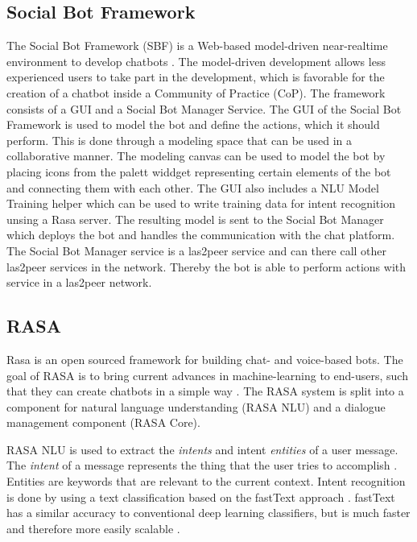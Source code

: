 \subsection{Social Bot Framework}
The Social Bot Framework (SBF) is a Web-based model-driven near-realtime environment to develop chatbots \cite{NLKl19}. 
The model-driven development allows less experienced users to take part in the development, which is favorable for the creation of a chatbot inside a Community of Practice (CoP). 
The framework consists of a GUI and a Social Bot Manager Service.
The GUI of the Social Bot Framework is used to model the bot and define the actions, which it should perform. 
This is done through a modeling space that can be used in a collaborative manner. The modeling canvas can be used to model the bot by placing icons from the palett widdget representing certain elements of the bot and connecting them with each other. 
The GUI also includes a NLU Model Training helper which can be used to write training data for intent recognition unsing a Rasa server.
The resulting model is sent to the Social Bot Manager which deploys the bot and handles the communication with the chat platform. 
The Social Bot Manager service is a las2peer service and can there call other las2peer services in the network. 
Thereby the bot is able to perform actions with service in a las2peer network.

\subsection{RASA}
Rasa is an open sourced framework for building chat- and voice-based bots. The goal of RASA is to bring current advances in machine-learning to end-users, such that they can create chatbots in a simple way \cite{BFPN17}. 
The RASA system is split into a component for natural language understanding (RASA NLU) and a dialogue management component (RASA Core).

RASA NLU is used to extract the \emph{intents} and intent \emph{entities} of a user message.
The \emph{intent} of a message represents the thing that the user tries to accomplish \footnotemark. 
Entities are keywords that are relevant to the current context.
Intent recognition is done by using a text classification based on the fastText approach \cite{BFPN17}. 
fastText has a similar accuracy to conventional deep learning classifiers, but is much faster and therefore more easily scalable \cite{JGBM16}.


